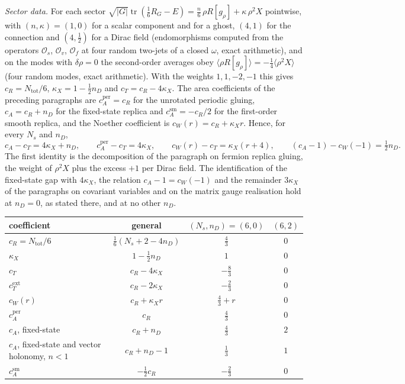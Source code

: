 \emph{Sector data.} For each sector \(\sqrt{|G|}\operatorname{tr}(\tfrac16R_G-E)=\tfrac n6\,\rho R[g_\rho]+\kappa\,\rho^2X\) pointwise, with \((n,\kappa)=(1,0)\) for a scalar component and for a ghost, \((4,1)\) for the connection and \((4,\tfrac12)\) for a Dirac field (endomorphisms computed from the operators \(\mathcal O_s\), \(\mathcal O_v\), \(\mathcal O_f\) at four random two-jets of a closed \(\omega\), exact arithmetic), and on the modes with \(\delta\rho=0\) the second-order averages obey \(\langle\rho R[g_\rho]\rangle=-\tfrac14\langle\rho^2X\rangle\) (four random modes, exact arithmetic). With the weights \(1,1,-2,-1\) this gives \(c_R=N_{\mathrm{tot}}/6\), \(\kappa_X=1-\tfrac12n_D\) and \(c_T=c_R-4\kappa_X\). The area coefficients of the preceding paragraphs are \(c_A^{\mathrm{per}}=c_R\) for the unrotated periodic gluing, \(c_A=c_R+n_D\) for the fixed-state replica and \(c_A^{\mathrm{sm}}=-c_R/2\) for the first-order smooth replica, and the Noether coefficient is \(c_W(r)=c_R+\kappa_Xr\). Hence, for every \(N_s\) and \(n_D\),
\[
  c_A-c_T=4\kappa_X+n_D,\qquad c_A^{\mathrm{per}}-c_T=4\kappa_X,\qquad c_W(r)-c_T=\kappa_X(r+4),\qquad (c_A-1)-c_W(-1)=\tfrac12n_D .
\]
The first identity is the decomposition of the paragraph on fermion replica gluing, the weight of \(\rho^2X\) plus the excess \(+1\) per Dirac field. The identification of the fixed-state gap with \(4\kappa_X\), the relation \(c_A-1=c_W(-1)\) and the remainder \(3\kappa_X\) of the paragraphs on covariant variables and on the matrix gauge realisation hold at \(n_D=0\), as stated there, and at no other \(n_D\).
\begin{center}
\begin{tabular}{@{}lccc@{}}
\toprule
coefficient & general & \((N_s,n_D)=(6,0)\) & \((6,2)\)\\
\midrule
\(c_R=N_{\mathrm{tot}}/6\) & \(\tfrac16(N_s+2-4n_D)\) & \(\tfrac43\) & \(0\)\\
\(\kappa_X\) & \(1-\tfrac12n_D\) & \(1\) & \(0\)\\
\(c_T\) & \(c_R-4\kappa_X\) & \(-\tfrac83\) & \(0\)\\
\(c_T^{\mathrm{ext}}\) & \(c_R-2\kappa_X\) & \(-\tfrac23\) & \(0\)\\
\(c_W(r)\) & \(c_R+\kappa_Xr\) & \(\tfrac43+r\) & \(0\)\\
\(c_A^{\mathrm{per}}\) & \(c_R\) & \(\tfrac43\) & \(0\)\\
\(c_A\), fixed-state & \(c_R+n_D\) & \(\tfrac43\) & \(2\)\\
\(c_A\), fixed-state and vector holonomy, \(n<1\) & \(c_R+n_D-1\) & \(\tfrac13\) & \(1\)\\
\(c_A^{\mathrm{sm}}\) & \(-\tfrac12c_R\) & \(-\tfrac23\) & \(0\)\\
\bottomrule
\end{tabular}
\end{center}

